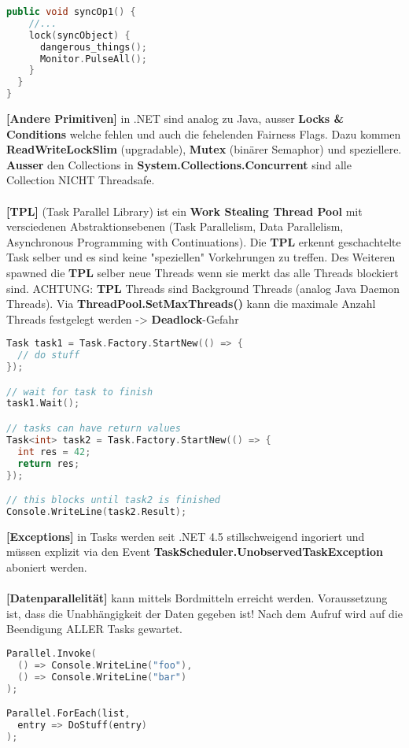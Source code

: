 \documentclass[8pt]{extarticle}
\let\oldtextbf\textbf
\renewcommand{\textbf}{\tiny\oldtextbf}
\begin{document}
\begin{multicols*}{5}
\begin{lstlisting}[language=c++]
  public void syncOp1() {
    //...
    lock(syncObject) {
      dangerous_things();
      Monitor.PulseAll();
    }
  }
}
\end{lstlisting}
\textbf{[Andere Primitiven]} in .NET sind analog zu Java, ausser \textbf{Locks \& Conditions} welche fehlen und auch die fehelenden Fairness Flags. Dazu kommen \textbf{ReadWriteLockSlim} (upgradable), \textbf{Mutex} (binärer Semaphor) und speziellere. \textbf{Ausser} den Collections in \textbf{System.Collections.Concurrent} sind alle Collection NICHT Threadsafe.\\\\
\textbf{[TPL]} (Task Parallel Library) ist ein \textbf{Work Stealing Thread Pool} mit versciedenen Abstraktionsebenen (Task Parallelism, Data Parallelism, Asynchronous Programming with Continuations). Die \textbf{TPL} erkennt geschachtelte Task selber und es sind keine "speziellen" Vorkehrungen zu treffen. Des Weiteren spawned die \textbf{TPL} selber neue Threads wenn sie merkt das alle Threads blockiert sind. ACHTUNG: \textbf{TPL} Threads sind Background Threads (analog Java Daemon Threads). Via \textbf{ThreadPool.SetMaxThreads()} kann die maximale Anzahl Threads festgelegt werden -> \textbf{Deadlock}-Gefahr
\begin{lstlisting}[language=c++]
Task task1 = Task.Factory.StartNew(() => {
  // do stuff
});

// wait for task to finish
task1.Wait();

// tasks can have return values
Task<int> task2 = Task.Factory.StartNew(() => {
  int res = 42;
  return res;
});

// this blocks until task2 is finished
Console.WriteLine(task2.Result);
\end{lstlisting}
\textbf{[Exceptions]} in Tasks werden seit .NET 4.5 stillschweigend ingoriert und müssen explizit via den Event \textbf{TaskScheduler.UnobservedTaskException} aboniert werden.\\\\
\textbf{[Datenparallelität]} kann mittels Bordmitteln erreicht werden. Voraussetzung ist, dass die Unabhängigkeit der Daten gegeben ist! Nach dem Aufruf wird auf die Beendigung ALLER Tasks gewartet.
\begin{lstlisting}[language=c++]
Parallel.Invoke(
  () => Console.WriteLine("foo"),
  () => Console.WriteLine("bar")
);

Parallel.ForEach(list,
  entry => DoStuff(entry)
);


\end{lstlisting}
\end{multicols*}
\end{document}
